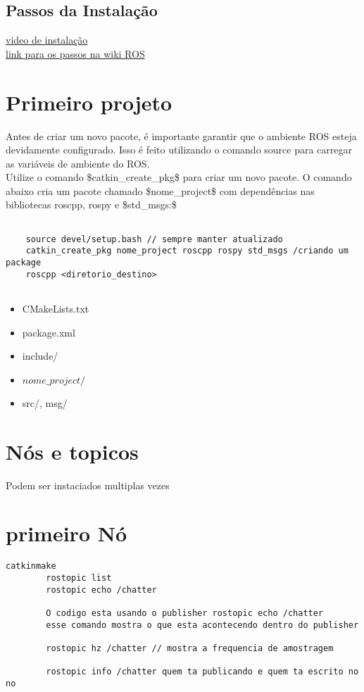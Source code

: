 \documentclass[letterpaper]{article}
\begin{document}
\subsection{Passos da Instalação}
\href{https://www.youtube.com/watch?v=FFDhLPgNftE&t=347s}{video de instalação}\\
\href{https://wiki.ros.org/noetic/Installation/Ubuntu}{link para os passos na wiki ROS}

\section{Primeiro projeto}
Antes de criar um novo pacote, é importante garantir que o ambiente ROS esteja devidamente configurado. Isso é feito utilizando o comando source para carregar as variáveis de ambiente do ROS.\\
Utilize o comando \$catkin\_create\_pkg\$ para criar um novo pacote. O comando abaixo cria um pacote chamado \$nome\_project\$ com dependências nas bibliotecas roscpp, rospy e \$std\_msgs:\$



\begin{lstlisting}[style=bashStyle, title=Comandos no terminal bash linux]

    source devel/setup.bash // sempre manter atualizado
    catkin_create_pkg nome_project roscpp rospy std_msgs /criando um package
    roscpp <diretorio_destino>
    
\end{lstlisting}

\begin{itemize}
    \item CMakeLists.txt
    \item package.xml
    \item include/
    \item $nome\_project/$
    \item src/, msg/
\end{itemize}
\section{Nós e topicos}
	 Podem ser instaciados multiplas vezes
\section{primeiro Nó}
    \begin{lstlisting}[style=cppStyle, title= talker\_cpp.cpp ] 
        catkinmake  
        rostopic list
        rostopic echo /chatter
        
        O codigo esta usando o publisher rostopic echo /chatter
        esse comando mostra o que esta acontecendo dentro do publisher
        
        rostopic hz /chatter // mostra a frequencia de amostragem
        
        rostopic info /chatter quem ta publicando e quem ta escrito no no    
    \end{lstlisting}
    
\end{document}
